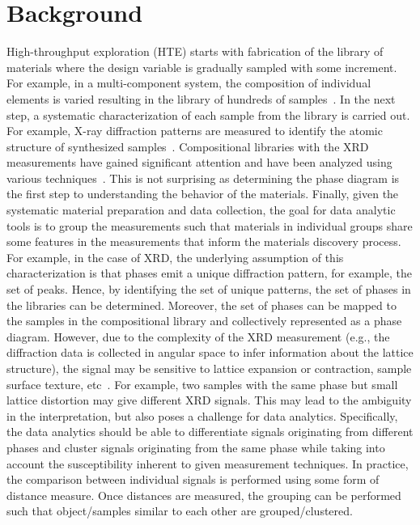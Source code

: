 \section{Background}
High-throughput exploration (HTE) starts with fabrication of the library of materials where the design variable is gradually sampled with some increment. 
For example, in a multi-component system, the composition of individual elements is varied resulting in the library of hundreds of samples~\cite{haber2014high}.
In the next step, a systematic characterization of each sample from the library is carried out. 
For example, X-ray diffraction patterns are measured to identify the atomic structure of synthesized samples~\cite{long2007rapid}. 
Compositional libraries with the XRD measurements have gained significant attention and have been analyzed using various techniques~\cite{Kusne2015HighthroughputDO,xiong2017automated}. 
This is not surprising as determining the phase diagram is the first step to understanding the behavior of the materials.
Finally, given the systematic material preparation and data collection, the goal for data analytic tools is to group the measurements such that materials in individual groups share some features in the measurements that inform the materials discovery process.
For example, in the case of XRD, the underlying assumption of this characterization is that phases emit a unique diffraction pattern, for example, the set of peaks. Hence, by identifying the set of unique patterns, the set of phases in the libraries can be determined. 
Moreover, the set of phases can be mapped to the samples in the compositional library and collectively represented as a phase diagram. 
However, due to the complexity of the XRD measurement (e.g., the diffraction data is collected in angular space to infer information about the lattice structure), the signal may be sensitive to lattice expansion or contraction, sample surface texture, etc~\cite{iwasaki2017comparison}.
For example, two samples with the same phase but small lattice distortion may give different XRD signals.
This may lead to the ambiguity in the interpretation, but also poses a challenge for data analytics. 
Specifically, the data analytics should be able to differentiate signals originating from different phases and cluster signals originating from the same phase while taking into account the susceptibility inherent to given measurement techniques. 
In practice, the comparison between individual signals is performed using some form of distance measure. 
Once distances are measured, the grouping can be performed such that object/samples similar to each other are grouped/clustered. 

